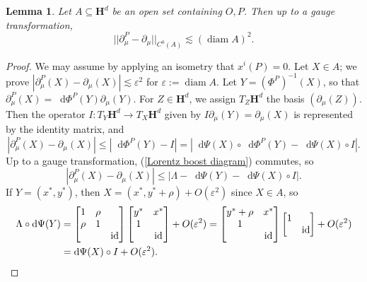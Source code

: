 \documentclass[reqno,11pt]{amsart}
\newcommand{\Hyp}{\mathbf H}
\DeclareMathOperator{\diam}{diam}
\DeclareMathOperator{\id}{id}
\newcommand*\dif{\mathop{}\!\mathrm{d}}
\newtheorem{lemma}[theorem]{Lemma}
\theoremstyle{definition}
\numberwithin{equation}{section}
\begin{document}
\begin{lemma}
Let $A \subseteq \Hyp^d$ be an open set containing $O, P$.
Then up to a gauge transformation,
\begin{equation}\label{difference of vector fields}
||\partial^P_\mu - \partial_\mu||_{C^0(A)} \lesssim (\diam A)^2.
\end{equation}
\end{lemma}
\begin{proof}
We may assume by applying an isometry that $x^i(P) = 0$.
Let $X \in A$; we prove $|\partial^P_\mu(X) - \partial_\mu(X)| \lesssim \varepsilon^2$ for $\varepsilon := \diam A$.
Let $Y = (\Phi^P)^{-1}(X)$, so that $\partial^P_\mu(X) = \dif \Phi^P(Y) \partial_\mu(Y)$.
For $Z \in \Hyp^d$, we assign $T_Z \Hyp^d$ the basis $(\partial_\mu(Z))$.
Then the operator $I: T_Y \Hyp^d \to T_X \Hyp^d$ given by $I \partial_\mu(Y) = \partial_\mu(X)$ is represented by the identity matrix, and
$$|\partial^P_\mu(X) - \partial_\mu(X)| \leq |\dif \Phi^P(Y) - I| = |\dif \Psi(X) \circ \dif \Phi^P(Y) - \dif \Psi(X) \circ I|.$$
Up to a gauge transformation, (\ref{Lorentz boost diagram}) commutes, so
$$|\partial^P_\mu(X) - \partial_\mu(X)| \leq |\Lambda - \dif \Psi(Y) - \dif \Psi(X) \circ I|.$$
If $Y = (x^*, y^*)$, then $X = (x^*, y^* + \rho) + O(\varepsilon^2)$ \cite[(4.5.5)]{ratcliffe2006foundations} since $X \in A$, so
\begin{align*}
\Lambda \circ \dif \Psi(Y) &= \begin{bmatrix}1 & \rho \\ \rho & 1 \\ && \id \end{bmatrix} \begin{bmatrix}y^* & x^* \\ 1 \\ & \id \end{bmatrix} + O(\varepsilon^2) = \begin{bmatrix}y^* + \rho & x^* \\ 1 \\ & \id\end{bmatrix} \begin{bmatrix}1 \\ & \id\end{bmatrix} + O(\varepsilon^2) \\
&= \dif \Psi(X) \circ I + O(\varepsilon^2). \qedhere
\end{align*}
\end{proof}
\end{document}
